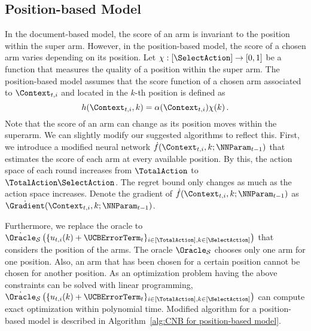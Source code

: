 \documentclass{article}
\theoremstyle{plain}
\begin{document}
\subsection{Position-based Model}
In the document-based model, the score of an arm is invariant to the position within the super arm. 
However, in the position-based model, the score of a chosen arm varies depending on its position. 
Let $\chi: [\SelectAction] \rightarrow [0,1]$ be a function that measures the quality of a position within the super arm. 
The position-based model assumes that the score function of a chosen arm associated to $\Context_{t,i}$ and located in the $k$-th position is defined as
\begin{equation}
    h(\Context_{t,i}, k) = \alpha(\Context_{t,i}) \chi(k) \,.
\end{equation}
Note that the score of an arm can change as its position moves within the superarm.
We can slightly modify our suggested algorithms to reflect this.
First, we introduce a modified neural network $\dot{f}(\Context_{t,i}, k; \NNParam_{t-1})$ that estimates the score of each arm at every available position.
By this, the action space of each round increases from $\TotalAction$ to $\TotalAction\SelectAction$.
The regret bound only changes as much as the action space increases.
Denote the gradient of $\dot{f}(\Context_{t,i}, k; \NNParam_{t-1})$ as $\dot{\Gradient}(\Context_{t,i}, k; \NNParam_{t-1})$.

Furthermore, we replace the oracle to $\dot{\Oracle}_{\mathcal{S}} \left( \{u_{t,i}(k) + \UCBErrorTerm_t \}_{i \in [\TotalAction], k \in [\SelectAction]} \right)$ that considers the position of the arms.  
The oracle $\dot{\Oracle}_{\mathcal{S}}$ chooses only one arm for one position.
Also, an arm that has been chosen for a certain position cannot be chosen for another position.
As an optimization problem having the above constraints can be solved with linear programming, $\dot{\Oracle}_{\mathcal{S}} \left( \{u_{t,i}(k) + \UCBErrorTerm_t \}_{i \in [\TotalAction], k \in [\SelectAction]} \right)$ can compute exact optimization within polynomial time.
Modified algorithm for a position-based model is described in Algorithm~\ref{alg:CNB for position-based model}.
\end{document}
